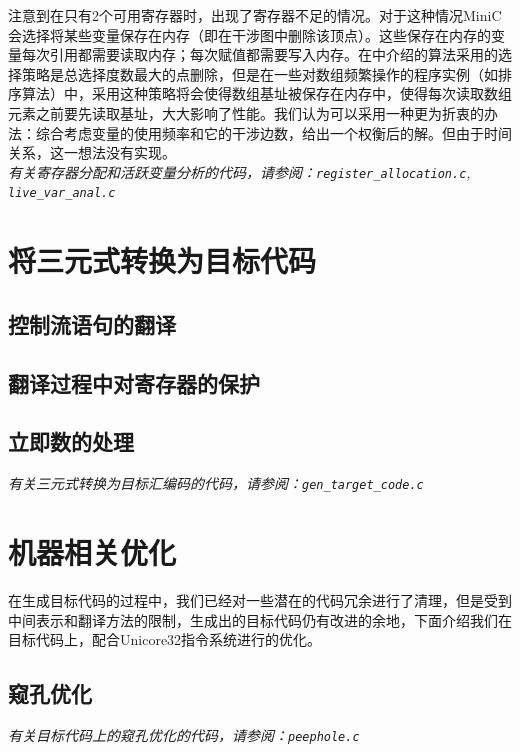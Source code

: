 注意到在只有2个可用寄存器时，出现了寄存器不足的情况。对于这种情况MiniC会选择将某些变量保存在内存（即在干涉图中删除该顶点）。这些保存在内存的变量每次引用都需要读取内存；每次赋值都需要写入内存。在\cite{sunjiasu}中介绍的算法采用的选择策略是总选择度数最大的点删除，但是在一些对数组频繁操作的程序实例（如排序算法）中，采用这种策略将会使得数组基址被保存在内存中，使得每次读取数组元素之前要先读取基址，大大影响了性能。我们认为可以采用一种更为折衷的办法：综合考虑变量的使用频率和它的干涉边数，给出一个权衡后的解。但由于时间关系，这一想法没有实现。\\
{\it \anchor 有关寄存器分配和活跃变量分析的代码，请参阅：\verb|register_allocation.c|, \verb|live_var_anal.c|}\\
\section{将三元式转换为目标代码}
\label{tripletotarget}
\subsection{控制流语句的翻译}

\subsection{翻译过程中对寄存器的保护}

\subsection{立即数的处理}

{\it \anchor 有关三元式转换为目标汇编码的代码，请参阅：\verb|gen_target_code.c|}\\
\section{机器相关优化}
\label{depopt}
在生成目标代码的过程中，我们已经对一些潜在的代码冗余进行了清理，但是受到中间表示和翻译方法的限制，生成出的目标代码仍有改进的余地，下面介绍我们在目标代码上，配合Unicore32指令系统进行的优化。
\subsection{窥孔优化}
\label{peephole:target}
{\it \anchor 有关目标代码上的窥孔优化的代码，请参阅：\verb|peephole.c|}\\
